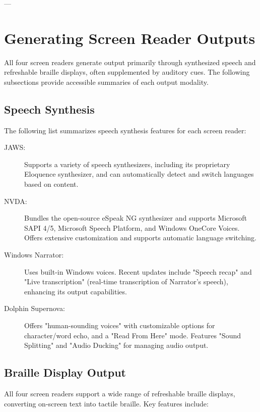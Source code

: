 ---

\section{Generating Screen Reader Outputs}
\label{sec:generating-outputs}

All four screen readers generate output primarily through synthesized speech and refreshable braille displays, often supplemented by auditory cues. The following subsections provide accessible summaries of each output modality.

\subsection{Speech Synthesis}
\label{subsec:speech-synthesis}
The following list summarizes speech synthesis features for each screen reader:

\begin{description}
    \item[JAWS:] Supports a variety of speech synthesizers, including its proprietary Eloquence synthesizer, and can automatically detect and switch languages based on content. \cite{JAWSWhatsNew}
    \item[NVDA:] Bundles the open-source eSpeak NG synthesizer and supports Microsoft SAPI 4/5, Microsoft Speech Platform, and Windows OneCore Voices. Offers extensive customization and supports automatic language switching. \cite{NVDASpeech}
    \item[Windows Narrator:] Uses built-in Windows voices. Recent updates include "Speech recap" and "Live transcription" (real-time transcription of Narrator's speech), enhancing its output capabilities. \cite{NarratorWhatsNew}
    \item[Dolphin Supernova:] Offers "human-sounding voices" with customizable options for character/word echo, and a "Read From Here" mode. Features "Sound Splitting" and "Audio Ducking" for managing audio output. \cite{SuperNovaSpeech}
\end{description}

\subsection{Braille Display Output}
\label{subsec:braille-output}
All four screen readers support a wide range of refreshable braille displays, converting on-screen text into tactile braille. Key features include:

